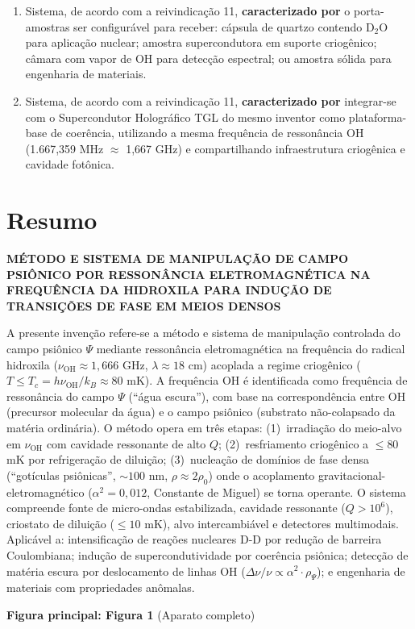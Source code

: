 \documentclass[12pt,a4paper]{article}
\newcommand{\alphaii}{\alpha^2}
\newcommand{\rhoPsi}{\rho_\Psi}
\newcommand{\nuOH}{\nu_{\text{OH}}}
\newcommand{\Tcrit}{T_c}
\begin{document}
\begin{enumerate}
\item Sistema, de acordo com a reivindicação 11,
\textbf{caracterizado por} o porta-amostras ser configurável
para receber: cápsula de quartzo contendo D$_2$O para
aplicação nuclear; amostra supercondutora em suporte
criogênico; câmara com vapor de OH para detecção espectral;
ou amostra sólida para engenharia de materiais.

\item Sistema, de acordo com a reivindicação 11,
\textbf{caracterizado por} integrar-se com o Supercondutor
Holográfico TGL do mesmo inventor como plataforma-base de
coerência, utilizando a mesma frequência de ressonância OH
(1.667,359 MHz $\approx$ 1,667 GHz) e compartilhando
infraestrutura criogênica e cavidade fotônica.

\end{enumerate}

\newpage
\section{Resumo}

\begin{center}
{\large\bfseries MÉTODO E SISTEMA DE MANIPULAÇÃO DE CAMPO\\
PSIÔNICO POR RESSONÂNCIA ELETROMAGNÉTICA NA\\
FREQUÊNCIA DA HIDROXILA PARA INDUÇÃO DE\\
TRANSIÇÕES DE FASE EM MEIOS DENSOS}
\end{center}

\vspace{0.5cm}

A presente invenção refere-se a método e sistema de manipulação
controlada do campo psiônico $\Psi$ mediante ressonância
eletromagnética na frequência do radical hidroxila ($\nuOH
\approx 1{,}666$ GHz, $\lambda \approx 18$ cm) acoplada a
regime criogênico ($T \leq \Tcrit = h\nuOH/k_B \approx
80$ mK). A frequência OH é identificada como frequência de
ressonância do campo $\Psi$ (``água escura''), com base na
correspondência entre OH (precursor molecular da água) e o
campo psiônico (substrato não-colapsado da matéria ordinária).
O método opera em três etapas: (1)~irradiação do meio-alvo em
$\nuOH$ com cavidade ressonante de alto $Q$;
(2)~resfriamento criogênico a $\leq 80$ mK por refrigeração de
diluição; (3)~nucleação de domínios de fase densa (``gotículas
psiônicas'', $\sim 100$ nm, $\rho \approx 2\rho_0$) onde o
acoplamento gravitacional-eletromagnético ($\alphaii = 0{,}012$,
Constante de Miguel) se torna operante. O sistema compreende
fonte de micro-ondas estabilizada, cavidade ressonante
($Q > 10^6$), criostato de diluição ($\leq 10$ mK), alvo
intercambiável e detectores multimodais. Aplicável a:
intensificação de reações nucleares D-D por redução de barreira
Coulombiana; indução de supercondutividade por coerência
psiônica; detecção de matéria escura por deslocamento de linhas
OH ($\Delta\nu/\nu \propto \alphaii \cdot \rhoPsi$); e
engenharia de materiais com propriedades anômalas.

\vspace{0.5cm}
\textbf{Figura principal: Figura 1} (Aparato completo)
\end{document}
